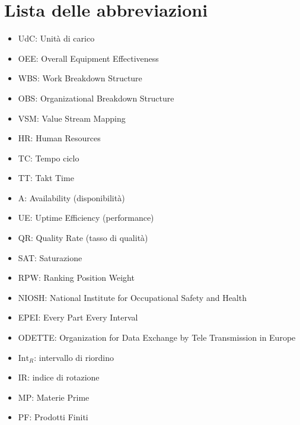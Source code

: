\documentclass[11pt]{article}
\begin{document}
\vfill

\newpage
\thispagestyle{empty}
\tableofcontents

\newpage
\thispagestyle{empty}
\listoffigures

\newpage
\thispagestyle{empty}
\section*{Lista delle abbreviazioni}
\begin{itemize}
    \item UdC: Unità di carico
    \item OEE: Overall Equipment Effectiveness
    \item WBS: Work Breakdown Structure
    \item OBS: Organizational Breakdown Structure
    \item VSM: Value Stream Mapping
    \item HR: Human Resources
    \item TC: Tempo ciclo
    \item TT: Takt Time
    \item A: Availability (disponibilità)
    \item UE: Uptime Efficiency (performance)
    \item QR: Quality Rate (tasso di qualità)
    \item SAT: Saturazione
    \item RPW: Ranking Position Weight
    \item NIOSH: National Institute for Occupational Safety and Health
    \item EPEI: Every Part Every Interval
    \item ODETTE: Organization for Data Exchange by Tele Transmission in Europe
    \item $\text{Int}_R$: intervallo di riordino
    \item IR: indice di rotazione
    \item MP: Materie Prime
    \item PF: Prodotti Finiti
\end{itemize}
\newpage
\end{document}
